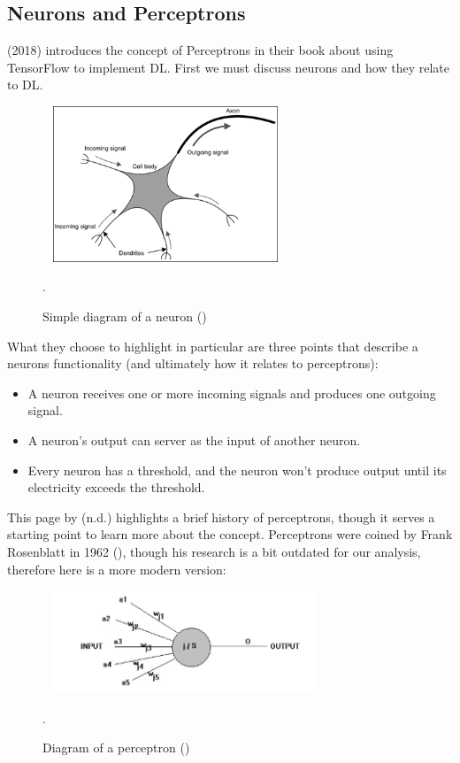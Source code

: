 \documentclass{article}
\begin{document}
\subsection{Neurons and Perceptrons}
\citeauthor{ScarpinoMatthew2018Tfd} (2018) introduces the concept of Perceptrons in their book about using TensorFlow to implement DL. First we 
must discuss neurons and how they relate to DL.
\begin{figure}[h]\
    \centering
    \includegraphics[width=0.6\textwidth]{neuron.png}
    \caption{Simple diagram of a neuron (\cite{ScarpinoMatthew2018Tfd})}.
\end{figure}
What they choose to highlight in particular are three points that describe a neurons functionality (and ultimately how 
it relates to perceptrons):
\begin{itemize}
    \item A neuron receives one or more incoming signals and produces one outgoing signal.
    \item A neuron’s output can server as the input of another neuron.
    \item Every neuron has a threshold, and the neuron won’t produce output until its electricity exceeds the threshold.
\end{itemize}
This page by \citeauthor{anonpercep} (n.d.) highlights a brief history of perceptrons, though 
it serves a starting point to learn more about the concept. Perceptrons were coined by Frank Rosenblatt in 1962  
(\cite{rosenblatt1961principles}), though his research is a bit outdated for our analysis, therefore here is a 
more modern version:
\begin{figure}[h]\
    \centering
    \includegraphics[width=0.7\textwidth]{perceptron.jpg}
    \caption{Diagram of a perceptron (\cite{anonpercep})}.
\end{figure}
\end{document}
